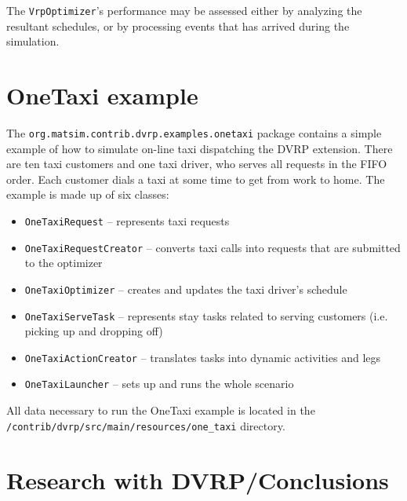 The \lstinline$VrpOptimizer$'s performance may be assessed either by analyzing the resultant schedules, or by processing events that has arrived during the simulation.


\section{OneTaxi example}

The \lstinline$org.matsim.contrib.dvrp.examples.onetaxi$ package contains a simple example of how to simulate on-line taxi dispatching the DVRP extension. There are ten taxi customers and one taxi driver, who serves all requests in the FIFO order. Each customer dials a taxi at some time to get from work to home. The example is made up of six classes:
%
\begin{itemize}
	\item \lstinline$OneTaxiRequest$ -- represents taxi requests
	
	\item \lstinline$OneTaxiRequestCreator$ -- converts taxi calls into requests that are submitted to the optimizer
	
	\item \lstinline$OneTaxiOptimizer$ -- creates and updates the taxi driver's schedule
	
	\item \lstinline$OneTaxiServeTask$ -- represents stay tasks related to serving customers (i.e. picking up and dropping off)
	
	\item \lstinline$OneTaxiActionCreator$ -- translates tasks into dynamic activities and legs
	
	\item \lstinline$OneTaxiLauncher$ -- sets up and runs the whole scenario
\end{itemize}

All data necessary to run the OneTaxi example is located in the \lstinline$/contrib/dvrp/src/main/resources/one_taxi$ directory.


\section{Research with DVRP/Conclusions}

